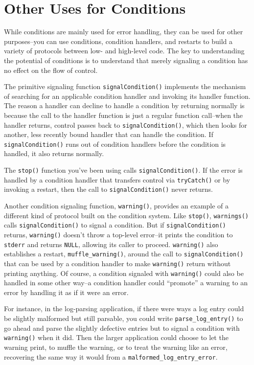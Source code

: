 \hypertarget{other-uses-for-conditions}{%
\section{Other Uses for Conditions}\label{other-uses-for-conditions}}

While conditions are mainly used for error handling, they can be used
for other purposes--you can use conditions, condition handlers, and
restarts to build a variety of protocols between low- and high-level
code. The key to understanding the potential of conditions is to
understand that merely signaling a condition has no effect on the flow
of control.

The primitive signaling function \texttt{signalCondition()} implements
the mechanism of searching for an applicable condition handler and
invoking its handler function. The reason a handler can decline to
handle a condition by returning normally is because the call to the
handler function is just a regular function call--when the handler
returns, control passes back to \texttt{signalCondition()}, which then
looks for another, less recently bound handler that can handle the
condition. If \texttt{signalCondition()} runs out of condition handlers
before the condition is handled, it also returns normally.

The \texttt{stop()} function you've been using calls
\texttt{signalCondition()}. If the error is handled by a condition
handler that transfers control via \texttt{tryCatch()} or by invoking a
restart, then the call to \texttt{signalCondition()} never returns.

Another condition signaling function, \texttt{warning()}, provides an
example of a different kind of protocol built on the condition system.
Like \texttt{stop()}, \texttt{warnings()} calls
\texttt{signalCondition()} to signal a condition. But if
\texttt{signalCondition()} returns, \texttt{warning()} doesn't throw a
top-level error--it prints the condition to \texttt{stderr} and returns
\texttt{NULL}, allowing its caller to proceed. \texttt{warning()} also
establishes a restart, \texttt{muffle\_warning()}, around the call to
\texttt{signalCondition()} that can be used by a condition handler to
make \texttt{warning()} return without printing anything. Of course, a
condition signaled with \texttt{warning()} could also be handled in some
other way--a condition handler could ``promote'' a warning to an error
by handling it as if it were an error.

For instance, in the log-parsing application, if there were ways a log
entry could be slightly malformed but still parsable, you could write
\texttt{parse\_log\_entry()} to go ahead and parse the slightly
defective entries but to signal a condition with \texttt{warning()} when
it did. Then the larger application could choose to let the warning
print, to muffle the warning, or to treat the warning like an error,
recovering the same way it would from a
\texttt{malformed\_log\_entry\_error}.

